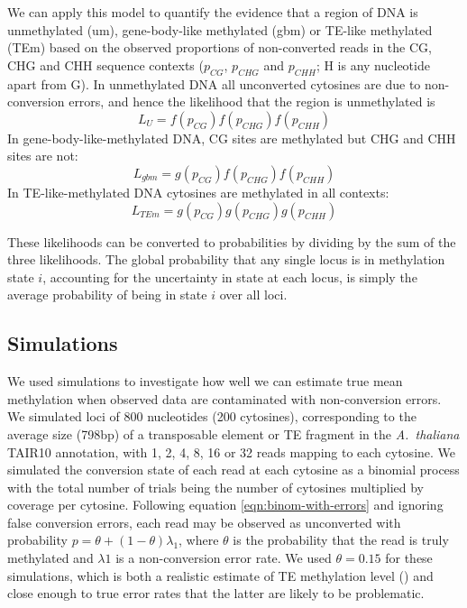 \documentclass[twocolumn,twoside,lettersize]{article}
\begin{document}
We can apply this model to quantify the evidence that a region of DNA is unmethylated (um), gene-body-like methylated (gbm) or TE-like methylated (TEm) based on the observed proportions of non-converted reads in the CG, CHG and CHH sequence contexts ($p_{CG}$, $p_{CHG}$ and $p_{CHH}$; H is any nucleotide apart from G).
In unmethylated DNA all unconverted cytosines are due to non-conversion errors, and hence the likelihood that the region is unmethylated is
\begin{equation}
    L_U = f(p_{CG}) f(p_{CHG}) f(p_{CHH})
\end{equation}
In gene-body-like-methylated DNA, CG sites are methylated but CHG and CHH sites are not: 
\begin{equation}
    L_{gbm} = g(p_{CG}) f(p_{CHG}) f(p_{CHH})
\end{equation}
In TE-like-methylated DNA cytosines are methylated in all contexts:
\begin{equation}
    L_{TEm} = g(p_{CG}) g(p_{CHG}) g(p_{CHH})
\end{equation}

These likelihoods can be converted to probabilities by dividing by the sum of the three likelihoods.
The global probability that any single locus is in methylation state $i$, accounting for the uncertainty in state at each locus, is simply the average probability of being in state $i$ over all loci.

\subsection{Simulations}

We used simulations to investigate how well we can estimate true mean methylation when observed data are contaminated with non-conversion errors.
We simulated loci of 800 nucleotides (200 cytosines), corresponding to the average size (798bp) of a transposable element or TE fragment in the \textit{A.~thaliana} TAIR10 annotation, with 1, 2, 4, 8, 16 or 32 reads mapping to each cytosine.
We simulated the conversion state of each read at each cytosine as a binomial process with the total number of trials being the number of cytosines multiplied by coverage per cytosine.
Following equation \ref{eqn:binom-with-errors} and ignoring false conversion errors, each read may be observed as unconverted with probability $p=\theta + (1-\theta)\lambda_1$, where $\theta$ is the probability that the read is truly methylated and $\lambda1$ is a non-conversion error rate.
We used $\theta=0.15$ for these simulations, which is both a realistic estimate of TE methylation level (\cite{dubin2015dna}) and close enough to true error rates that the latter are likely to be problematic.
\end{document}

